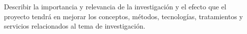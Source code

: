 Describir la importancia y relevancia de la investigación y el efecto que el proyecto tendrá en mejorar los conceptos, métodos, tecnologías, tratamientos y servicios relacionados al tema de investigación.